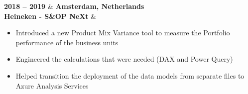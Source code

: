 \textbf{2018 – 2019} & \textbf{Amsterdam, Netherlands} \\
\textbf{Heineken - S\&OP NeXt} & 
\begin{itemize}[leftmargin=0.5cm,itemsep=0pt,parsep=0pt]
\item Introduced a new Product Mix Variance tool to measure the Portfolio performance of the business units
\item Engineered the calculations that were needed (DAX and Power Query)
\item Helped transition the deployment of the data models from separate files to Azure Analysis Services
\end{itemize} \\ 